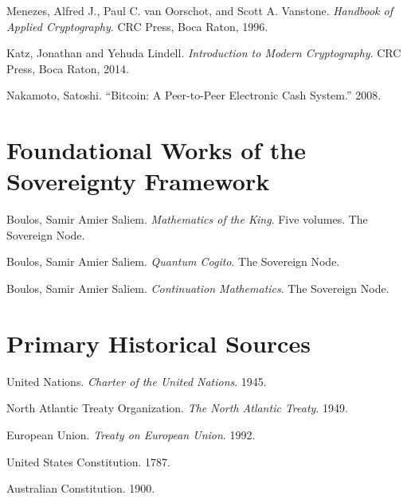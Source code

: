 \documentclass[11pt,openany]{book}
\theoremstyle{plain}
\theoremstyle{definition}
\begin{document}
Menezes, Alfred J., Paul C. van Oorschot, and Scott A. Vanstone.
\textit{Handbook of Applied Cryptography}.
CRC Press, Boca Raton, 1996.

Katz, Jonathan and Yehuda Lindell.
\textit{Introduction to Modern Cryptography}.
CRC Press, Boca Raton, 2014.

Nakamoto, Satoshi.
``Bitcoin: A Peer-to-Peer Electronic Cash System.''
2008.


\section*{Foundational Works of the Sovereignty Framework}

Boulos, Samir Amier Saliem.
\textit{Mathematics of the King}.
Five volumes.
The Sovereign Node.

Boulos, Samir Amier Saliem.
\textit{Quantum Cogito}.
The Sovereign Node.

Boulos, Samir Amier Saliem.
\textit{Continuation Mathematics}.
The Sovereign Node.


\section*{Primary Historical Sources}

United Nations.
\textit{Charter of the United Nations}.
1945.

North Atlantic Treaty Organization.
\textit{The North Atlantic Treaty}.
1949.

European Union.
\textit{Treaty on European Union}.
1992.

United States Constitution.
1787.

Australian Constitution.
1900.
\end{document}
